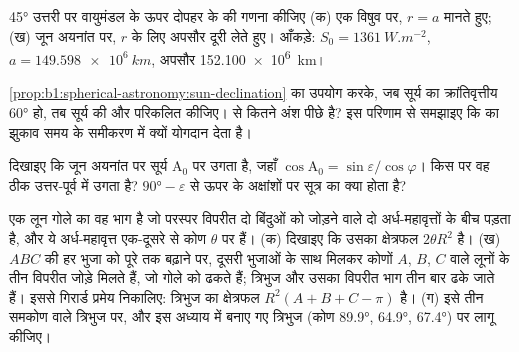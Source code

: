 \begin{exercise}[$\star\star$]\label{exo:b1:spherical-astronomy:9}
\ang{45} उत्तरी  पर वायुमंडल के ऊपर दोपहर के  की गणना कीजिए (क) एक विषुव पर, $r = a$
मानते हुए; (ख) जून अयनांत पर, $r$ के लिए अपसौर दूरी लेते हुए। आँकड़े: $S_0 = \qty{1361}{W.m^{-2}}$,
$a = \qty{149.598e6}{km}$, अपसौर \qty{152.100e6}{km}।
\end{exercise}

\begin{exercise}[$\star\star\star$]\label{exo:b1:spherical-astronomy:10}
\cref{prop:b1:spherical-astronomy:sun-declination} का उपयोग करके, जब सूर्य का क्रांतिवृत्तीय
 \ang{60} हो, तब सूर्य की  और  परिकलित कीजिए।   से कितने
अंश पीछे है? इस परिणाम से समझाइए कि  का झुकाव समय के समीकरण में क्यों योगदान देता है।
\end{exercise}

\begin{exercise}[$\star\star\star$]\label{exo:b1:spherical-astronomy:11}
दिखाइए कि जून अयनांत पर सूर्य  $\mathrm{A}_0$ पर उगता है, जहाँ
$\cos\mathrm{A}_0 = \sin\varepsilon/\cos\varphi$। किस  पर वह ठीक उत्तर-पूर्व में उगता है?
$\ang{90} - \varepsilon$ से ऊपर के अक्षांशों पर सूत्र का क्या होता है?
\end{exercise}

\begin{exercise}[$\star\star\star$]\label{exo:b1:spherical-astronomy:12}
एक लून गोले का वह भाग है जो परस्पर विपरीत दो बिंदुओं को जोड़ने वाले दो अर्ध-महावृत्तों के बीच
पड़ता है, और ये अर्ध-महावृत्त एक-दूसरे से कोण $\theta$ पर हैं। (क) दिखाइए कि उसका क्षेत्रफल
$2\theta R^2$ है। (ख)  $ABC$ की हर भुजा को पूरे  तक बढ़ाने पर, दूसरी भुजाओं
के साथ मिलकर कोणों $A$, $B$, $C$ वाले लूनों के तीन विपरीत जोड़े मिलते हैं, जो गोले को ढकते हैं;
त्रिभुज और उसका विपरीत भाग तीन बार ढके जाते हैं। इससे गिरार्ड प्रमेय निकालिए: त्रिभुज का
क्षेत्रफल $R^2(A + B + C - \pi)$ है। (ग) इसे तीन समकोण वाले त्रिभुज पर, और इस अध्याय में बनाए
गए त्रिभुज (कोण \ang{89.9}, \ang{64.9}, \ang{67.4}) पर लागू कीजिए।
\end{exercise}


